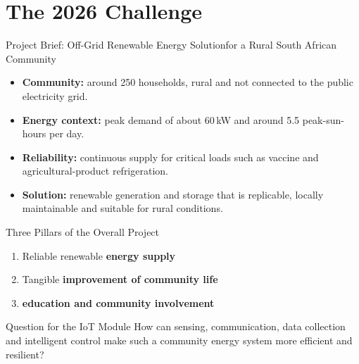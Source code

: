 \section[nosectionpage]{The 2026 Challenge}

\begin{frame}{Project Brief: Off-Grid Renewable Energy Solution}{for a Rural South African Community}
\begin{itemize}
    \item \textbf{Community:} around 250 households, rural and not connected to the public electricity grid.
    \item \textbf{Energy context:} peak demand of about 60\,kW and around 5.5 peak-sun-hours per day.
    \item \textbf{Reliability:} continuous supply for critical loads such as vaccine and agricultural-product refrigeration.
    \item \textbf{Solution:} renewable generation and storage that is replicable, locally maintainable and suitable for rural conditions.
\end{itemize}
\begin{block}{Three Pillars of the Overall Project}
\begin{enumerate}
    \item Reliable renewable \textbf{energy supply}
    \item Tangible \textbf{improvement of community life}
    \item \textbf{education and community involvement}
\end{enumerate}
\end{block}
\begin{alertblock}{Question for the IoT Module}
How can sensing, communication, data collection and intelligent control make such a community energy system more efficient and resilient?
\end{alertblock}
\end{frame}
